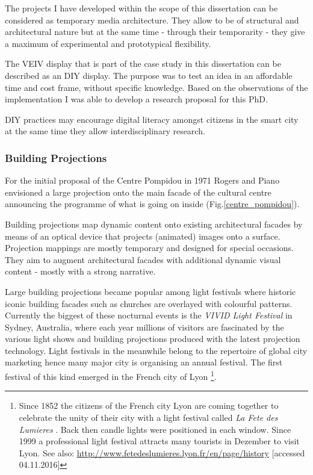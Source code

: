 
The projects I have developed within the scope of this dissertation can be considered as temporary media architecture. They allow to be of structural and architectural nature but at the same time - through their temporarity - they give a maximum of experimental and prototypical flexibility. 

The VEIV display that is part of the case study in this dissertation can be described as an DIY display. The purpose was to test an idea in an affordable time and cost frame, without specific knowledge. Based on the observations of the implementation I was able to develop a research proposal for this PhD.

DIY practices may encourage digital literacy amongst citizens in the smart city at the same time they allow interdisciplinary research. 



\subsubsection{Building Projections}

For the initial proposal of the Centre Pompidou  in 1971 Rogers and Piano envisioned a large projection onto the main facade of the cultural centre announcing the programme of what is going on inside (Fig.\ref{centre_pompidou}).  

Building projections map dynamic content onto existing architectural facades by means of an optical device that projects (animated) images onto a surface. Projection mappings are mostly temporary and designed for special occasions. They aim to augment architectural facades with additional dynamic visual content - mostly with a strong narrative.  

Large building projections became popular among light festivals where historic iconic building facades such as churches are overlayed with colourful patterns. Currently the biggest of these nocturnal events is the \textit{VIVID Light Festival}  in Sydney, Australia, where each year millions of visitors are fascinated by the various light shows and building projections produced with the latest projection technology. Light festivals in the meanwhile belong to the repertoire of global city marketing hence many major city is organising an annual festival. The first festival of this kind emerged in the French city of Lyon \footnote{Since 1852 the citizens of the French city Lyon are coming together to celebrate the unity of their city with a light festival called \textit{La Fete des Lumieres} . Back then candle lights were positioned in each window. Since 1999 a professional light festival attracts many tourists in Dezember to visit Lyon. See also: \url{http://www.fetedeslumieres.lyon.fr/en/page/history} [accessed 04.11.2016]}.    



